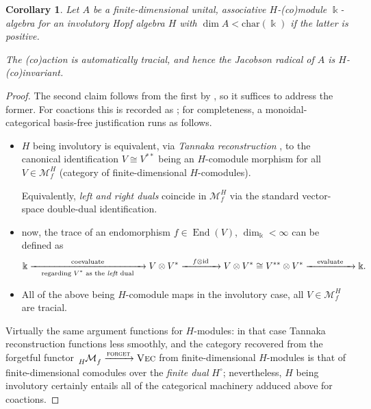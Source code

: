 \documentclass[11pt,leqno]{article}
\theoremstyle{plain}
\newtheorem{corollary}[lemma]{Corollary}
\theoremstyle{plain}
\theoremstyle{plain}
\numberwithin{equation}{section}
\theoremstyle{nonumberplain}
\newtheorem{proof}{Proof}
\newcommand\cM{{\mathcal M}}
\newcommand\1{{\bf 1}}
\DeclareMathOperator{\id}{id}
\DeclareMathOperator{\End}{\mathrm{End}}
\newcommand{\cat}[1]{\textsc{#1}}
\begin{document}
\begin{corollary}\label{cor:h.inv.assoc}
  Let $A$ be a finite-dimensional unital, associative $H$-(co)module $\Bbbk$-algebra for an involutory Hopf algebra $H$ with $\dim A<\mathrm{char}(\Bbbk)$ if the latter is positive.

  The (co)action is automatically tracial, and hence the Jacobson radical of $A$ is $H$-(co)invariant. 
\end{corollary}
\begin{proof}
  The second claim follows from the first by , so it suffices to address the former. For coactions this is recorded as \cite[Lemma 3.1]{MR3514537}; for completeness, a monoidal-categorical basis-free justification runs as follows.

  \begin{itemize}[wide]
    \item $H$ being involutory is equivalent, via \emph{Tannaka reconstruction} \cite[Theorem 2.4.2]{schau_tann}, to the canonical identification $V\cong V^{**}$ being an $H$-comodule morphism for all $V\in \cM^H_f$ (category of finite-dimensional $H$-comodules).

      Equivalently, \emph{left and right duals} \cite[Definition 1.2.3]{schau_tann} coincide in $\cM^H_f$ via the standard vector-space double-dual identification.

    \item now, the trace of an endomorphism $f\in \End(V)$, $\dim_{\Bbbk}<\infty$ can be defined as
      \begin{equation*}
        \Bbbk
        \xrightarrow[\quad\text{regarding $V^*$ as the \emph{left} dual}\quad]{\quad\text{coevaluate}\quad}
        V\otimes V^*
        \xrightarrow{\quad f\otimes\id\quad}
        V\otimes V^*
        \cong
        V^{**}\otimes V^*
        \xrightarrow{\quad\text{evaluate}\quad}
        \Bbbk.
      \end{equation*}
    \item All of the above being $H$-comodule maps in the involutory case, all $V\in \cM^H_f$ are tracial. 
    \end{itemize}
    Virtually the same argument functions for $H$-modules: in that case Tannaka reconstruction functions less smoothly, and the category recovered from the forgetful functor $\tensor*[_{H}]{\cM}{_f}\xrightarrow{\cat{forget}}\cat{Vec}$ from finite-dimensional $H$-modules is that of finite-dimensional comodules over the \emph{finite dual} \cite[Definition 1.2.3]{mont} $H^{\circ}$; nevertheless, $H$ being involutory certainly entails all of the categorical machinery adduced above for coactions.
\end{proof}
\end{document}
